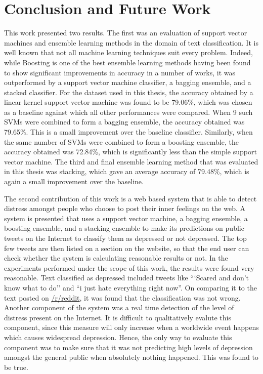 \chapter{Conclusion and Future Work}
\label{chapter:Conclusion}

This work presented two results. The first was an evaluation of support vector machines and ensemble learning methods in the domain of text classification. It is well known that not all machine learning techniques suit every problem. Indeed, while Boosting is one of the best ensemble learning methods having been found to show significant improvements in accuracy in a number of works, it was outperformed by a support vector machine classifier, a bagging ensemble, and a stacked classifier. For the dataset used in this thesis, the accuracy obtained by a linear kernel support vector machine was found to be 79.06\%, which was chosen as a baseline against which all other performances were compared. When 9 such SVMs were combined to form a bagging ensemble, the accuracy obtained was 79.65\%. This is a small improvement over the baseline classifier. Similarly, when the same number of SVMs were combined to form a boosting ensemble, the accuracy obtained was 72.84\%, which is significantly less than the simple support vector machine. The third and final ensemble learning method that was evaluated in this thesis was stacking, which gave an average accuracy of 79.48\%, which is again a small improvement over the baseline.

The second contribution of this work is a web based system that is able to detect distress amongst people who choose to post their inner feelings on the web. A system is presented that uses a support vector machine, a bagging ensemble, a boosting ensemble, and a stacking ensemble to make its predictions on public tweets on the Internet to classify them as depressed or not depressed. The top few tweets are then listed on a section on the website, so that the end user can check whether the system is calculating reasonable results or not. In the experiments performed under the scope of this work, the results were found very reasonable. Text classified as depressed included tweets like ```Scared and don't know what to do'' and ``i just hate everything right now''. On comparing it to the text posted on \href{http://www.reddit.com/r/suicidewatch}{/r/reddit}, it was found that the classification was not wrong. Another component of the system was a real time detection of the level of distress present on the Internet. It is difficult to qualitatively evalute this component, since this measure will only increase when a worldwide event happens which causes widespread depression. Hence, the only way to evaluate this component was to make sure that it was not predicting high levels of depression amongst the general public when absolutely nothing happened. This was found to be true.

